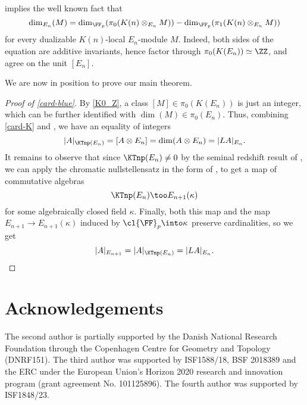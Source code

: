 \documentclass[english]{article}
\begin{document}
\begin{rem}\label{dim_dim}
     implies the well known fact that
    \[
        \dim_{E_n}(M) = 
        \dim_{\FF_p}(\pi_0(K(n)\otimes_{E_n}M)) - 
        \dim_{\FF_p}(\pi_1(K(n)\otimes_{E_n}M))
    \]
    for every dualizable $K(n)$-local $E_n$-module $M$. Indeed, both sides of the equation are additive invariants, hence factor through $\pi_0(K(E_n)) \simeq \ZZ$, and agree on the unit $[E_n]$. 
\end{rem}

We are now in position to prove our main theorem.

\begin{proof}[Proof of \cref{card-blue}]
    By \cref{K0_Z}, a class $[M] \in \pi_0(K(E_n))$ is just an integer, which can be further identified with $\dim(M) \in \pi_0(E_n)$. Thus, combining \cref{card-K} and \cite[Corollary 3.3.10]{TeleAmbi}, we have an equality of integers
    \[
        |A|_{\KTnp(E_n)} = [A \otimes E_n] = \dim(A \otimes E_n) = |LA|_{E_n}.
    \]
    It remains to observe that since $\KTnp(E_n) \neq 0$ by the seminal redshift result of \cite[Theorem A]{yuan2021examples}, we can apply the chromatic nullstellensatz in the form of \cite[Theorem D]{Null}, to get a map of commutative algebras 
    \[
        \KTnp(E_n) \too E_{n+1}(\kappa)
    \]
    for some algebraically closed field $\kappa$. Finally, both this map and the map $E_{n+1} \to E_{n+1}(\kappa)$ induced by $\cl{\FF}_p \into \kappa$ preserve cardinalities, so we get 
    \[
        |A|_{E_{n+1}} = |A|_{\KTnp(E_n)} = |LA|_{E_n}.
    \]
\end{proof}



\section{Acknowledgements}

The second author is partially supported by the Danish National Research Foundation through the Copenhagen Centre for Geometry and Topology (DNRF151).
The third author was supported by ISF1588/18, BSF 2018389 and the ERC under the European Union's Horizon 2020 research and innovation program (grant agreement No. 101125896). The fourth author was supported by ISF1848/23.




\end{document}
